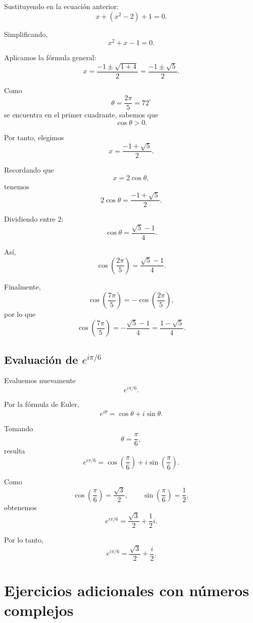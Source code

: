 Sustituyendo en la ecuación anterior:
\[
x+(x^2-2)+1=0.
\]

Simplificando,
\[
x^2+x-1=0.
\]

Aplicamos la fórmula general:
\[
x
=
\frac{-1\pm\sqrt{1+4}}{2}
=
\frac{-1\pm\sqrt{5}}{2}.
\]

Como
\[
\theta=\frac{2\pi}{5}=72^\circ
\]
se encuentra en el primer cuadrante, sabemos que
\[
\cos\theta>0.
\]

Por tanto, elegimos
\[
x=\frac{-1+\sqrt{5}}{2}.
\]

Recordando que
\[
x=2\cos\theta,
\]
tenemos
\[
2\cos\theta
=
\frac{-1+\sqrt{5}}{2}.
\]

Dividiendo entre $2$:
\[
\cos\theta
=
\frac{\sqrt{5}-1}{4}.
\]

Así,
\[
\boxed{
\cos\left(\frac{2\pi}{5}\right)
=
\frac{\sqrt{5}-1}{4}
}.
\]

Finalmente,
\[
\cos\left(\frac{7\pi}{5}\right)
=
-\cos\left(\frac{2\pi}{5}\right),
\]
por lo que
\[
\boxed{
\cos\left(\frac{7\pi}{5}\right)
=
-\frac{\sqrt{5}-1}{4}
=
\frac{1-\sqrt{5}}{4}
}.
\]

\subsection{Evaluación de $e^{i\pi/6}$}

Evaluemos nuevamente
\[
e^{i\pi/6}.
\]

Por la fórmula de Euler,
\[
e^{i\theta}
=
\cos\theta+i\sin\theta.
\]

Tomando
\[
\theta=\frac{\pi}{6},
\]
resulta
\[
e^{i\pi/6}
=
\cos\left(\frac{\pi}{6}\right)
+
i\sin\left(\frac{\pi}{6}\right).
\]

Como
\[
\cos\left(\frac{\pi}{6}\right)
=
\frac{\sqrt{3}}{2},
\qquad
\sin\left(\frac{\pi}{6}\right)
=
\frac{1}{2},
\]
obtenemos
\[
e^{i\pi/6}
=
\frac{\sqrt{3}}{2}
+
\frac{1}{2}i.
\]

Por lo tanto,
\[
\boxed{
e^{i\pi/6}
=
\frac{\sqrt{3}}{2}
+
\frac{i}{2}
}.
\]

\section{Ejercicios adicionales con números complejos}

